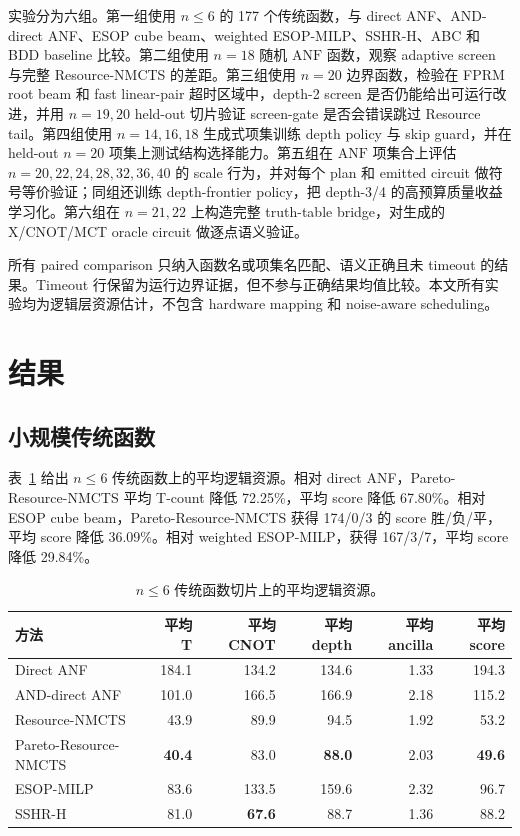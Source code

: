 \documentclass[UTF8,fontset=macnew,11pt]{ctexart}
\newcommand{\method}{Resource-NMCTS}
\newcommand{\anf}{\ensuremath{\mathrm{ANF}}}
\newcommand{\ttable}{truth-table}
\begin{document}
实验分为六组。第一组使用 $n\leq6$ 的 177 个传统函数，与 direct ANF、AND-direct ANF、ESOP cube beam、weighted ESOP-MILP、SSHR-H、ABC 和 BDD baseline 比较。第二组使用 $n=18$ 随机 \anf{} 函数，观察 adaptive screen 与完整 \method{} 的差距。第三组使用 $n=20$ 边界函数，检验在 FPRM root beam 和 fast linear-pair 超时区域中，depth-2 screen 是否仍能给出可运行改进，并用 $n=19,20$ held-out 切片验证 screen-gate 是否会错误跳过 Resource tail。第四组使用 $n=14,16,18$ 生成式项集训练 depth policy 与 skip guard，并在 held-out $n=20$ 项集上测试结构选择能力。第五组在 \anf{} 项集合上评估 $n=20,22,24,28,32,36,40$ 的 scale 行为，并对每个 plan 和 emitted circuit 做符号等价验证；同组还训练 depth-frontier policy，把 depth-3/4 的高预算质量收益学习化。第六组在 $n=21,22$ 上构造完整 \ttable{} bridge，对生成的 X/CNOT/MCT oracle circuit 做逐点语义验证。

所有 paired comparison 只纳入函数名或项集名匹配、语义正确且未 timeout 的结果。Timeout 行保留为运行边界证据，但不参与正确结果均值比较。本文所有实验均为逻辑层资源估计，不包含 hardware mapping 和 noise-aware scheduling。

\section{结果}

\subsection{小规模传统函数}

表~\ref{tab:traditional} 给出 $n\leq6$ 传统函数上的平均逻辑资源。相对 direct ANF，Pareto-\method{} 平均 T-count 降低 72.25\%，平均 score 降低 67.80\%。相对 ESOP cube beam，Pareto-\method{} 获得 174/0/3 的 score 胜/负/平，平均 score 降低 36.09\%。相对 weighted ESOP-MILP，获得 167/3/7，平均 score 降低 29.84\%。

\begin{table}[t]
\centering
\small
\caption{$n\leq6$ 传统函数切片上的平均逻辑资源。}
\label{tab:traditional}
\begin{tabular}{lrrrrr}
\toprule
方法 & 平均 T & 平均 CNOT & 平均 depth & 平均 ancilla & 平均 score \\
\midrule
Direct ANF & 184.1 & 134.2 & 134.6 & 1.33 & 194.3 \\
AND-direct ANF & 101.0 & 166.5 & 166.9 & 2.18 & 115.2 \\
\method{} & 43.9 & 89.9 & 94.5 & 1.92 & 53.2 \\
Pareto-\method{} & \textbf{40.4} & 83.0 & \textbf{88.0} & 2.03 & \textbf{49.6} \\
ESOP-MILP & 83.6 & 133.5 & 159.6 & 2.32 & 96.7 \\
SSHR-H & 81.0 & \textbf{67.6} & 88.7 & 1.36 & 88.2 \\
\bottomrule
\end{tabular}
\end{table}
\end{document}
